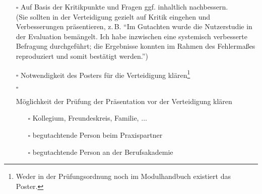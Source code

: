 \begin{itemize}
{\begin{itemize}
{\begin{itemize}
                \end{itemize}
            }
            \item[$\square$]{
                Auf Basis der Kritikpunkte und Fragen ggf. inhaltlich nachbessern.\\
                (Sie sollten in der Verteidigung gezielt auf Kritik eingehen und Verbesserungen präsentieren, z.\,B. \enquote{Im Gutachten wurde die Nutzerstudie in der Evaluation bemängelt. Ich habe inzwischen eine systemisch verbesserte Befragung durchgeführt; die Ergebnisse konnten im Rahmen des Fehlermaßes reproduziert und somit bestätigt werden.})
            }         
            \item[$\square$] Notwendigkeit des Posters für die Verteidigung klären\footnote{Weder in der Prüfungsordnung noch im Modulhandbuch existiert das Poster.}
            \item[$\square$]{
                Möglichkeit der Prüfung der Präsentation vor der Verteidigung klären
                \begin{itemize}
                    \item[$\square$] Kollegium, Freundeskreis, Familie, $\ldots$
                    \item[$\square$] begutachtende Person beim Praxispartner
                    \item[$\square$] begutachtende Person an der Berufsakademie
                \end{itemize}
            }
        \end{itemize}
    }
\end{itemize}